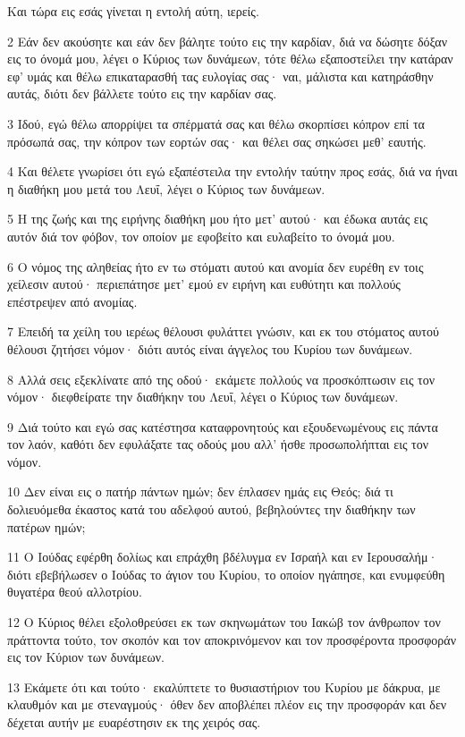 \par Και τώρα εις εσάς γίνεται η εντολή αύτη, ιερείς.
\par 2 Εάν δεν ακούσητε και εάν δεν βάλητε τούτο εις την καρδίαν, διά να δώσητε δόξαν εις το όνομά μου, λέγει ο Κύριος των δυνάμεων, τότε θέλω εξαποστείλει την κατάραν εφ' υμάς και θέλω επικαταρασθή τας ευλογίας σας· ναι, μάλιστα και κατηράσθην αυτάς, διότι δεν βάλλετε τούτο εις την καρδίαν σας.
\par 3 Ιδού, εγώ θέλω απορρίψει τα σπέρματά σας και θέλω σκορπίσει κόπρον επί τα πρόσωπά σας, την κόπρον των εορτών σας· και θέλει σας σηκώσει μεθ' εαυτής.
\par 4 Και θέλετε γνωρίσει ότι εγώ εξαπέστειλα την εντολήν ταύτην προς εσάς, διά να ήναι η διαθήκη μου μετά του Λευΐ, λέγει ο Κύριος των δυνάμεων.
\par 5 Η της ζωής και της ειρήνης διαθήκη μου ήτο μετ' αυτού· και έδωκα αυτάς εις αυτόν διά τον φόβον, τον οποίον με εφοβείτο και ευλαβείτο το όνομά μου.
\par 6 Ο νόμος της αληθείας ήτο εν τω στόματι αυτού και ανομία δεν ευρέθη εν τοις χείλεσιν αυτού· περιεπάτησε μετ' εμού εν ειρήνη και ευθύτητι και πολλούς επέστρεψεν από ανομίας.
\par 7 Επειδή τα χείλη του ιερέως θέλουσι φυλάττει γνώσιν, και εκ του στόματος αυτού θέλουσι ζητήσει νόμον· διότι αυτός είναι άγγελος του Κυρίου των δυνάμεων.
\par 8 Αλλά σεις εξεκλίνατε από της οδού· εκάμετε πολλούς να προσκόπτωσιν εις τον νόμον· διεφθείρατε την διαθήκην του Λευΐ, λέγει ο Κύριος των δυνάμεων.
\par 9 Διά τούτο και εγώ σας κατέστησα καταφρονητούς και εξουδενωμένους εις πάντα τον λαόν, καθότι δεν εφυλάξατε τας οδούς μου αλλ' ήσθε προσωπολήπται εις τον νόμον.
\par 10 Δεν είναι εις ο πατήρ πάντων ημών; δεν έπλασεν ημάς εις Θεός; διά τι δολιευόμεθα έκαστος κατά του αδελφού αυτού, βεβηλούντες την διαθήκην των πατέρων ημών;
\par 11 Ο Ιούδας εφέρθη δολίως και επράχθη βδέλυγμα εν Ισραήλ και εν Ιερουσαλήμ· διότι εβεβήλωσεν ο Ιούδας το άγιον του Κυρίου, το οποίον ηγάπησε, και ενυμφεύθη θυγατέρα θεού αλλοτρίου.
\par 12 Ο Κύριος θέλει εξολοθρεύσει εκ των σκηνωμάτων του Ιακώβ τον άνθρωπον τον πράττοντα τούτο, τον σκοπόν και τον αποκρινόμενον και τον προσφέροντα προσφοράν εις τον Κύριον των δυνάμεων.
\par 13 Εκάμετε ότι και τούτο· εκαλύπτετε το θυσιαστήριον του Κυρίου με δάκρυα, με κλαυθμόν και με στεναγμούς· όθεν δεν αποβλέπει πλέον εις την προσφοράν και δεν δέχεται αυτήν με ευαρέστησιν εκ της χειρός σας.
